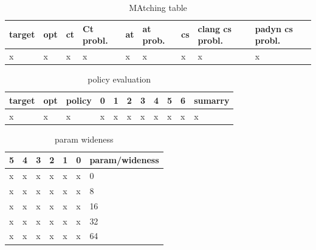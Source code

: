 \begin{table}[H]
\centering
\caption{MAtching table}
\label{Integer overflow bug detection in CWE-190}
\begin{tabular}{|l|l|l|l|l|l|l|l|l|} \hline
\textbf{target}  & \textbf{opt}     & \textbf{ct}    &\textbf{Ct probl.} & \textbf{at}  & \textbf{at prob.} &\textbf{cs} & \textbf{clang cs probl.}  & \textbf{padyn cs probl.}  \\ \hline 
x                &x                 &x               &x                  &x             &x                  &x           &x                          &x   \\ \hline

\end{tabular}
\end{table}


\begin{table}[H]
\centering
\caption{policy evaluation}
\label{Integer overflow bug detection in CWE-190}
\begin{tabular}{|l|l|l|l|l|l|l|l|l|l|l|} \hline
\textbf{target}  & \textbf{opt}     & \textbf{policy}    &\textbf{0} & \textbf{1}  & \textbf{2} &\textbf{3} & \textbf{4}  & \textbf{5} & \textbf{6}  & \textbf{sumarry}  \\ \hline 
x                &x                 &x                   &x          &x            &x           &x          &x            &x           &x            &x \\ \hline

\end{tabular}
\end{table}

\begin{table}[H]
\centering
\caption{param wideness}
\label{Integer overflow bug detection in CWE-190}
\begin{tabular}{|l|l|l|l|l|l|l|} \hline
\textbf{5}  & \textbf{4}     & \textbf{3}    &\textbf{2} & \textbf{1}  & \textbf{0} &\textbf{param/wideness}  \\ \hline 
x           &x               &x              &x          &x            &x           &0                         \\ \hline
x           &x               &x              &x          &x            &x           &8                         \\ \hline
x           &x               &x              &x          &x            &x           &16                         \\ \hline
x           &x               &x              &x          &x            &x           &32                         \\ \hline
x           &x               &x              &x          &x            &x           &64                         \\ \hline

\end{tabular}
\end{table}


